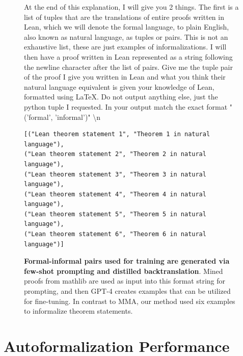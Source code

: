 \documentclass{article} %
\begin{document}
\begin{figure}[htbp]
\centering
\begin{mdframed}[linewidth=1pt, roundcorner=10pt, backgroundcolor=gray!10]
At the end of this explanation, I will give you 2 things. The first is a list of tuples that are the translations of entire proofs written in Lean, which we will denote the formal language, to plain English, also known as natural language, as tuples or pairs. This is not an exhaustive list, these are just examples of informalizations. I will then have a proof written in Lean represented as a string following the newline character after the list of pairs. Give me the tuple pair of the proof I give you written in Lean and what you think their natural language equivalent is given your knowledge of Lean, formatted using LaTeX. Do not output anything else, just the python tuple I requested. In your output match the exact format "('formal', 'informal')" \textbackslash n \\

\begin{verbatim}
[("Lean theorem statement 1", "Theorem 1 in natural language"),
("Lean theorem statement 2", "Theorem 2 in natural language"),
("Lean theorem statement 3", "Theorem 3 in natural language"),
("Lean theorem statement 4", "Theorem 4 in natural language"),
("Lean theorem statement 5", "Theorem 5 in natural language"),
("Lean theorem statement 6", "Theorem 6 in natural language")]
\end{verbatim}
\end{mdframed}
\caption{\textbf{Formal-informal pairs used for training are generated via few-shot prompting and distilled backtranslation}. Mined proofs from mathlib are used as input into this format string for prompting, and then GPT-4 creates examples that can be utilized for fine-tuning. In contrast to MMA, our method used six examples to informalize theorem statements.}
\label{fig:few_shot_prompt_example}
\end{figure}


\section{Autoformalization Performance}
\end{document}

